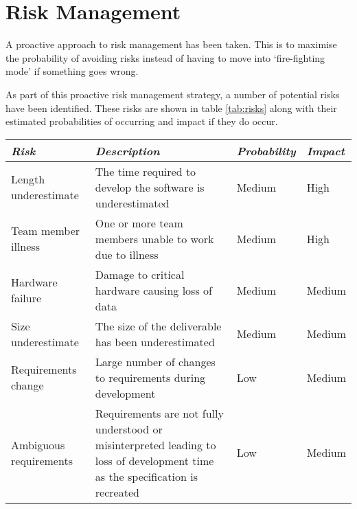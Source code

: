 \section{Risk Management}
\label{section:risk}

A proactive approach to risk management has been taken. This is to maximise the probability
of avoiding risks instead of having to move into `fire-fighting mode' if something goes
wrong.

As part of this proactive risk management strategy, a number of potential risks
have been identified. These risks are shown in table \ref{tab:risks} along with their
estimated probabilities of occurring and impact if they do occur.

\begin{table*}
	\small
	\begin{tabular}{l p{} l l}
		\toprule
		\emph{Risk} & \emph{Description} & \emph{Probability} & \emph{Impact} \\
		\midrule
		Length underestimate & The time required to develop the software is underestimated & Medium & High \\
		Team member illness & One or more team members unable to work due to illness & Medium & High \\
		Hardware failure & Damage to critical hardware causing loss of data & Medium & Medium \\
		Size underestimate & The size of the deliverable has been underestimated & Medium & Medium \\
		Requirements change & Large number of changes to requirements during development & Low & Medium \\
		Ambiguous requirements & Requirements are not fully understood or misinterpreted leading to
			loss of development time as the specification is recreated & Low & Medium \\
		\bottomrule
	\end{tabular}
	\vspace{1.5em}
	\caption{Risk identification}
	\label{tab:risks}
\end{table*}

